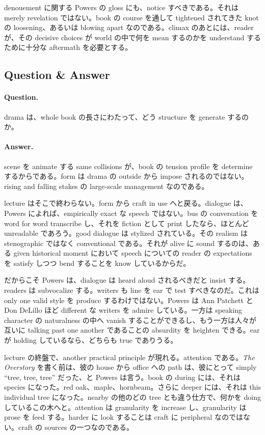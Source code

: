 denouement に関する Powers の gloss にも、notice すべきである。それは merely revelation ではない。book の course を通して tightened されてきた knot の loosening、あるいは blowing apart なのである。climax のあとには、reader が、その decisive choices が world の中で何を mean するのかを understand するために十分な aftermath を必要とする。

\subsection{Question \& Answer}

\paragraph{Question.} drama は、whole book の長さにわたって、どう structure を generate するのか。

\paragraph{Answer.} scene を animate する same collisions が、book の tension profile を determine するからである。form は drama の outside から impose されるのではない。rising and falling stakes の large-scale management なのである。

lecture はそこで終わらない。form から craft in use へと戻る。dialogue は、Powers によれば、empirically exact な speech ではない。bus の conversation を word for word transcribe し、それを fiction として print したなら、ほとんど unreadable であろう。good dialogue は stylized されている。その realism は stenographic ではなく conventional である。それが alive に sound するのは、ある given historical moment において speech についての reader の expectations を satisfy しつつ bend することを know しているからだ。

だからこそ Powers は、dialogue は heard aloud されるべきだと insist する。readers は subvocalize する。writers も line を ear で test すべきなのだ。これは only one valid style を produce するわけではない。Powers は Ann Patchett と Don DeLillo ほど different な writers を admire している。一方は speaking character の naturalness の中へ vanish することができるし、もう一方は人々が互いに talking past one another であることの absurdity を heighten できる。ear が holding しているなら、どちらも true でありうる。

lecture の終盤で、another practical principle が現れる。attention である。\emph{The Overstory} を書く前は、彼の house から office への path は、彼にとって simply ``tree, tree, tree'' だった、と Powers は言う。book の during には、それは species になった。red oak、maple、hornbeam。さらに deeper には、それは this individual tree になった。nearby の他のどの tree とも違う仕方で、何かを doing しているこの木へと。attention は granularity を increase し、granularity は prose を feed する。harder に look することは craft に peripheral なのではない。craft の sources の一つなのである。

